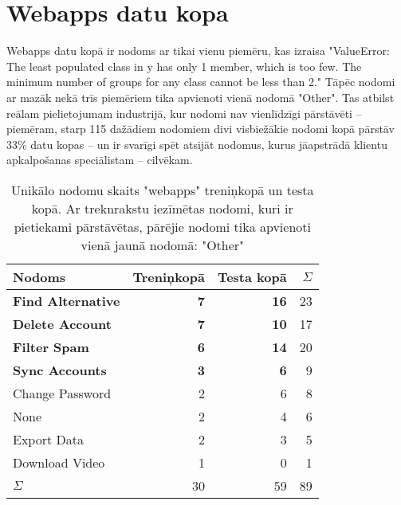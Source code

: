 \section{Webapps datu kopa}


Webapps datu kopā ir nodoms ar tikai vienu piemēru, kas izraisa "ValueError: The least populated class in y has only 1 member, which is too few. The minimum number of groups for any class cannot be less than 2." Tāpēc nodomi ar mazāk nekā trīs piemēriem tika apvienoti vienā nodomā "Other". Tas atbilst reālam pielietojumam industrijā, kur nodomi nav vienlīdzīgi pārstāvēti  -- piemēram, starp 115 dažādiem nodomiem divi visbiežākie nodomi kopā pārstāv 33\% datu kopas \cite{paikens2020} -- un ir svarīgi spēt atsijāt nodomus, kurus jāapstrādā klientu apkalpošanas speciālistam -- cilvēkam.



\begin{table}[htbp]
  \centering
  \caption{Unikālo nodomu skaits "webapps" treniņkopā un testa kopā. Ar treknrakstu iezīmētas nodomi, kuri ir pietiekami pārstāvētas, pārējie nodomi tika apvienoti vienā jaunā nodomā: "Other"}
    \begin{tabular}{lrrr} \toprule
    Nodoms & Treniņkopā & Testa kopā & $\Sigma$ \\\midrule
    \textbf{Find Alternative} & \textbf{7} & \textbf{16} & 23\\
    \textbf{Delete Account} & \textbf{7} & \textbf{10} & 17\\
    \textbf{Filter Spam} & \textbf{6} & \textbf{14} & 20 \\
    \textbf{Sync Accounts} & \textbf{3} & \textbf{6} & 9 \\
    Change Password & 2     & 6 & 8\\
    None  & 2     & 4 & 6\\
    Export Data & 2     & 3 & 5 \\
    Download Video & 1     & 0 & 1\\
    $\Sigma$ & 30    & 59 & 89 \\\bottomrule
    \end{tabular}%
  \label{tab:webapps-labels}%
\end{table}%




